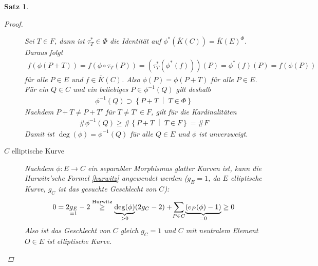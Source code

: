 \documentclass[english, german, parskip=half]{scrartcl}
\newtheorem{Satz}{Satz}[section]
\theoremstyle{definition}
\theoremstyle{remark}
\newcommand*{\algK}{\ensuremath{\overline K}} %
\renewcommand{\O}{O}
\newcommand{\F}{F} %
\begin{document}
\begin{Satz}
\begin{proof}
\begin{description}
      Sei $T\in\F$, dann ist $\tau_T^*\in\Phi$ die Identität auf
      $\phi^*(\algK(C))=\algK(E)^\Phi$. Daraus folgt
      \begin{gather*}
        f(\phi(P+T))
        = f(\phi\circ\tau_T(P)) 
        = \left( \tau_T^*(\phi^*(f)) \right)(P)
        = \phi^*(f)(P)
        = f(\phi(P))
      \end{gather*}
      für alle $P\in E$ und $f\in\algK(C)$.
      Also $\phi(P) = \phi(P+T)$ für alle $P\in E$.
      Für ein $Q\in C$ und ein beliebiges $P\in\phi^{-1}(Q)$ gilt
      deshalb
      \begin{gather*}
        \phi^{-1}(Q) 
        \supset \left\{ P+T \;\middle|\; T\in\Phi \right\}        
      \end{gather*}
      Nachdem $P+T\neq P+T'$ für $T\neq T'\in\F$, gilt für die
      Kardinalitäten
      \begin{gather*}
        \#\phi^{-1}(Q) 
        \geq \#\left\{ P+T \;\middle|\; T\in F \right\}
        = \#\F
      \end{gather*}
      Damit ist $\deg(\phi)=\phi^{-1}(Q)$ für alle $Q\in E$ und
      $\phi$ ist unverzweigt.
      
    \item[$C$ elliptische Kurve]
      Nachdem $\phi\colon E\to C$ ein separabler Morphismus glatter
      Kurven ist, kann die Hurwitz'sche Formel \autoref{hurwitz}
      angewendet werden ($g_E=1$, da $E$ elliptische Kurve, $g_C$ ist das
      gesuchte Geschlecht von $C$):
      \begin{align*}
        0
        = 2\underset{=1}{g_E}-2
        &\overset{\text{Hurwitz}}{\geq}
          \underbrace{\deg(\phi)}_{>0} (2g_C-2) 
          + \sum_{\mathclap{P\in C}}\underbrace{(e_P(\phi)-1)}_{=0}
          \geq 0\\
      \end{align*}
      Also ist das Geschlecht von $C$ gleich $g_C=1$ und $C$ mit
      neutralem Element $\O\in E$ ist elliptische Kurve.
    \end{description}
  \end{proof}

\end{Satz}


\nocite{*}
\printbibliography
\end{document}
